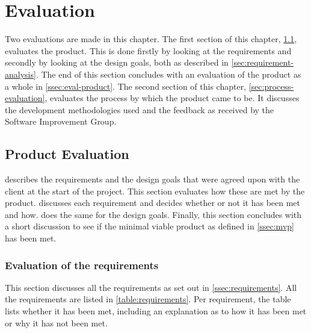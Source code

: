 \chapter{Evaluation}
\label{cha:evaluation}

Two evaluations are made in this chapter. The first section of this chapter,
\cref{sec:product-evaluation}, evaluates the product. This is done firstly by
looking at the requirements and secondly by looking at the design goals, both as
described in \cref{sec:requirement-analysis}. The end of this section concludes
with an evaluation of the product as a whole in \cref{ssec:eval-product}. The
second section of this chapter, \cref{sec:process-evaluation}, evaluates the
process by which the product came to be. It discusses the development
methodologies used and the feedback as received by the Software Improvement
Group.

\section{Product Evaluation}
\label{sec:product-evaluation}

 describes the requirements and the design goals
that were agreed upon with the client at the start of the project. This section
evaluates how these are met by the product. 
discusses each requirement and decides whether or not it has been met and how.
 does the same for the design goals.  Finally, this
section concludes with a short discussion to see if the minimal viable product
as defined in \cref{ssec:mvp} has been met.

\subsection{Evaluation of the requirements}
\label{ssec:eval-requirements}

This section discusses all the requirements as set out in
\cref{ssec:requirements}. All the requirements are listed in
\cref{table:requirements}. Per requirement, the table lists whether it has been
met, including an explanation as to how it has been met or why it has not been
met.

